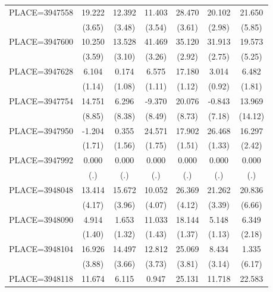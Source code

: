 {\begin{tabular}{l*{6}{c}}
PLACE=3947558       &      19.222&      12.392&      11.403&      28.470&      20.102&      21.650\\
                    &      (3.65)&      (3.48)&      (3.54)&      (3.61)&      (2.98)&      (5.85)\\
PLACE=3947600       &      10.250&      13.528&      41.469&      35.120&      31.913&      19.573\\
                    &      (3.59)&      (3.10)&      (3.26)&      (2.92)&      (2.75)&      (5.25)\\
PLACE=3947628       &       6.104&       0.174&       6.575&      17.180&       3.014&       6.482\\
                    &      (1.14)&      (1.08)&      (1.11)&      (1.12)&      (0.92)&      (1.81)\\
PLACE=3947754       &      14.751&       6.296&      -9.370&      20.076&      -0.843&      13.969\\
                    &      (8.85)&      (8.38)&      (8.49)&      (8.73)&      (7.18)&     (14.12)\\
PLACE=3947950       &      -1.204&       0.355&      24.571&      17.902&      26.468&      16.297\\
                    &      (1.71)&      (1.56)&      (1.75)&      (1.51)&      (1.33)&      (2.42)\\
PLACE=3947992       &       0.000&       0.000&       0.000&       0.000&       0.000&       0.000\\
                    &         (.)&         (.)&         (.)&         (.)&         (.)&         (.)\\
PLACE=3948048       &      13.414&      15.672&      10.052&      26.369&      21.262&      20.836\\
                    &      (4.17)&      (3.96)&      (4.07)&      (4.12)&      (3.39)&      (6.66)\\
PLACE=3948090       &       4.914&       1.653&      11.033&      18.144&       5.148&       6.349\\
                    &      (1.40)&      (1.32)&      (1.43)&      (1.37)&      (1.13)&      (2.18)\\
PLACE=3948104       &      16.926&      14.497&      12.812&      25.069&       8.434&       1.335\\
                    &      (3.88)&      (3.66)&      (3.73)&      (3.81)&      (3.14)&      (6.17)\\
PLACE=3948118       &      11.674&       6.115&       0.947&      25.131&      11.718&      22.583\\

\end{tabular}}

